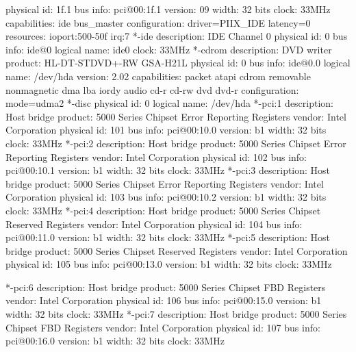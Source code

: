 \documentclass[mingoth,a4paper]{jsarticle}
\begin{document}
{{{{{{{{{{{{{{{{{{\begin{commandline}
             physical id: 1f.1
             bus info: pci@00:1f.1
             version: 09
             width: 32 bits
             clock: 33MHz
             capabilities: ide bus_master
             configuration: driver=PIIX_IDE latency=0
             resources: ioport:500-50f irq:7
           *-ide
                description: IDE Channel 0
                physical id: 0
                bus info: ide@0
                logical name: ide0
                clock: 33MHz
              *-cdrom
                   description: DVD writer
                   product: HL-DT-STDVD+-RW GSA-H21L
                   physical id: 0
                   bus info: ide@0.0
                   logical name: /dev/hda
                   version: 2.02
                   capabilities: packet atapi cdrom removable nonmagnetic dma lba iordy audio cd-r cd-rw dvd dvd-r
                   configuration: mode=udma2
                 *-disc
                      physical id: 0
                      logical name: /dev/hda
     *-pci:1
          description: Host bridge
          product: 5000 Series Chipset Error Reporting Registers
          vendor: Intel Corporation
          physical id: 101
          bus info: pci@00:10.0
          version: b1
          width: 32 bits
          clock: 33MHz
     *-pci:2
          description: Host bridge
          product: 5000 Series Chipset Error Reporting Registers
          vendor: Intel Corporation
          physical id: 102
          bus info: pci@00:10.1
          version: b1
          width: 32 bits
          clock: 33MHz
     *-pci:3
          description: Host bridge
          product: 5000 Series Chipset Error Reporting Registers
          vendor: Intel Corporation
          physical id: 103
          bus info: pci@00:10.2
          version: b1
          width: 32 bits
          clock: 33MHz
     *-pci:4
          description: Host bridge
          product: 5000 Series Chipset Reserved Registers
          vendor: Intel Corporation
          physical id: 104
          bus info: pci@00:11.0
          version: b1
          width: 32 bits
          clock: 33MHz
     *-pci:5
          description: Host bridge
          product: 5000 Series Chipset Reserved Registers
          vendor: Intel Corporation
          physical id: 105
          bus info: pci@00:13.0
          version: b1
          width: 32 bits
          clock: 33MHz
\end{commandline}
\begin{commandline}
     *-pci:6
          description: Host bridge
          product: 5000 Series Chipset FBD Registers
          vendor: Intel Corporation
          physical id: 106
          bus info: pci@00:15.0
          version: b1
          width: 32 bits
          clock: 33MHz
     *-pci:7
          description: Host bridge
          product: 5000 Series Chipset FBD Registers
          vendor: Intel Corporation
          physical id: 107
          bus info: pci@00:16.0
          version: b1
          width: 32 bits
          clock: 33MHz
\end{commandline}

}}}}}}}}}}}}}}}}}}
\end{document}
